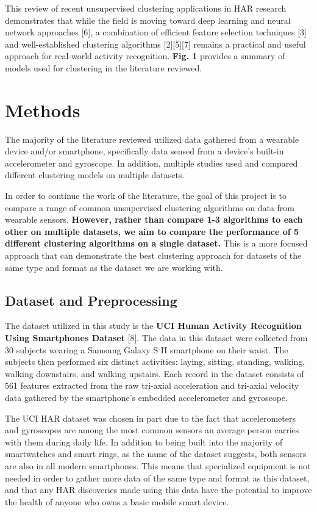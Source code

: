 \documentclass[12pt]{IEEEtran}
\begin{document}
This review of recent unsupervised clustering applications in HAR research demonstrates that while the field is moving toward deep learning and neural network approaches [6], a combination of efficient feature selection techniques [3] and well-established clustering algorithms [2][5][7] remains a practical and useful approach for real-world activity recognition. \textbf{Fig. 1} provides a summary of models used for clustering in the literature reviewed.

\section{Methods}
The majority of the literature reviewed utilized data gathered from a wearable device and/or smartphone, specifically data sensed from a device's built-in accelerometer and gyroscope. In addition, multiple studies used and compared different clustering models on multiple datasets. 

In order to continue the work of the literature, the goal of this project is to compare a range of common unsupervised clustering algorithms on data from wearable sensors. \textbf{However, rather than compare 1-3 algorithms to each other on multiple datasets, we aim to compare the performance of 5 different clustering algorithms on a single dataset.} This is a more focused approach that can demonstrate the best clustering approach for datasets of the same type and format as the dataset we are working with.

\subsection{Dataset and Preprocessing}
The dataset utilized in this study is the \textbf{UCI Human Activity Recognition Using Smartphones Dataset} [8]. The data in this dataset were collected from 30 subjects wearing a Samsung Galaxy S II smartphone on their waist. The subjects then performed six distinct activities: laying, sitting, standing, walking, walking downstairs, and walking upstairs. Each record in the dataset consists of 561 features extracted from the raw tri-axial acceleration and tri-axial velocity data gathered by the smartphone's embedded accelerometer and gyroscope.

The UCI HAR dataset was chosen in part due to the fact that accelerometers and gyroscopes are among the most common sensors an average person carries with them during daily life. In addition to being built into the majority of smartwatches and smart rings, as the name of the dataset suggests, both sensors are also in all modern smartphones. This means that specialized equipment is not needed in order to gather more data of the same type and format as this dataset, and that any HAR discoveries made using this data have the potential to improve the health of anyone who owns a basic mobile smart device.
\end{document}
